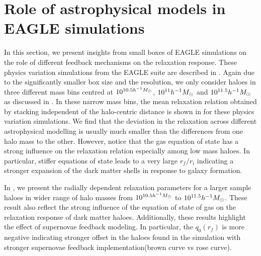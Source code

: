 \section{Role of astrophysical models in EAGLE simulations}
\label{sec:res-physvar-eagle}
In this section, we present insights from small boxes of EAGLE simulations on the role of different feedback mechanisms on the relaxation response. These physics variation simulations from the EAGLE suite are described in . Again due to the significantly smaller box size and the resolution, we only consider haloes in three different mass bins centred at $10^{10.5 h^{-1}M_{\odot}}$, $10^{11} h^{-1}M_{\odot}$ and $10^{11.5} h^{-1}M_{\odot}$ as discussed in . In these narrow mass bins, the mean relaxation relation obtained by stacking independent of the halo-centric distance is shown in  for these physics variation simulations. We find that the deviation in the relaxation across different astrophysical modelling is usually much smaller than the differences from one halo mass to the other. However, notice that the gas equation of state has a strong influence on the relaxation relation especially among low mass haloes. In particular, stiffer equations of state leads to a very large $r_f/r_i$ indicating a stronger expansion of the dark matter shells in response to galaxy formation.

In , we present the radially dependent relaxation parameters for a larger sample haloes in wider range of halo masses from $10^{10.5 h^{-1}M_{\odot}}$ to $10^{11.5} h^{-1}M_{\odot}$. These result also reflect the strong influence of the equation of state of gas on the relaxation response of dark matter haloes. Additionally, these results highlight the effect of supernovae feedback modeling. In particular, the $q_0(r_f)$ is more negative indicating stronger offset in the haloes found in the simulation with stronger supernovae feedback implementation(brown curve vs rose curve).    

